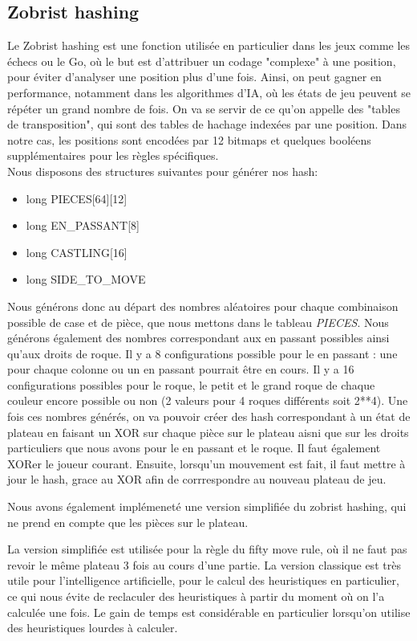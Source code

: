\documentclass{article}
\begin{document}
\subsection{Zobrist hashing} \label{Zobrist}
Le Zobrist hashing est une fonction utilisée en particulier dans les jeux comme les échecs ou le Go, où le but est d'attribuer un codage "complexe" à
une position, pour éviter d'analyser une position plus d'une fois. Ainsi, on peut gagner en performance, notamment dans les algorithmes d'IA, où les
états de jeu peuvent se répéter un grand nombre de fois. On va se servir de ce qu'on appelle des "tables de transposition", qui sont des tables de
hachage indexées par une position. Dans notre cas, les positions sont encodées par 12 bitmaps et quelques booléens
supplémentaires pour les règles spécifiques.
\\Nous disposons des structures suivantes pour générer nos hash:\\
\begin{itemize}
    \item long PIECES[64][12]
    \item long EN\_PASSANT[8]
    \item long CASTLING[16]
    \item long SIDE\_TO\_MOVE
\end{itemize}

Nous générons donc au départ des nombres aléatoires pour chaque combinaison possible de case et de pièce, que nous mettons dans le tableau \textit{PIECES}.
Nous générons également des nombres correspondant aux en passant possibles ainsi qu'aux droits de roque. Il y a 8 configurations possible pour le en passant :
une pour chaque colonne ou un en passant pourrait être en cours.
Il y a 16 configurations possibles pour le roque, le petit et le grand roque de chaque couleur encore possible ou non (2 valeurs pour 4 roques différents soit 2**4).
Une fois ces nombres générés, on va pouvoir créer des hash correspondant à un état de plateau en faisant un XOR sur chaque pièce sur le plateau aisni que sur
les droits particuliers que nous avons pour le en passant et le roque. Il faut également XORer le joueur courant.
Ensuite, lorsqu'un mouvement est fait, il faut mettre à jour le hash, grace au XOR afin de corrrespondre au nouveau plateau de jeu.

Nous avons également implémeneté une version simplifiée du zobrist hashing, qui ne prend en compte que les pièces sur le plateau.

La version simplifiée est utilisée pour la règle du fifty move rule, où il ne faut pas revoir le même plateau 3 fois au cours d'une partie.
La version classique est très utile pour l'intelligence artificielle, pour le calcul des heuristiques en particulier, ce qui nous évite de reclaculer des heuristiques 
à partir du moment où on l'a calculée une fois. Le gain de temps est considérable en particulier lorsqu'on utilise des heuristiques lourdes à calculer.
\end{document}
